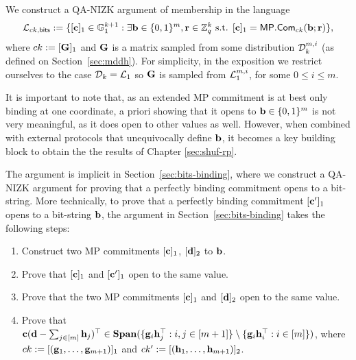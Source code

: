We construct a QA-NIZK argument of membership in the language
$$
\mathcal{L}_{ck,\mathsf{bits}} := \{[\mathbf{c}]_1\in\mathbb{G}_1^{k+1} : \exists \mathbf{b}\in\{0,1\}^m,\mathbf{r}\in\mathbb{Z}_q^k \text{ s.t. } [\mathbf{c}]_1 = \mathsf{MP}.\mathsf{Com}_{ck}(\mathbf{b};\mathbf{r})\},
$$
where $ck:=[\mathbf{{G}}]_1$ and $\mathbf{{G}}$ is a matrix sampled from 
some distribution $\mathcal{D}_k^{m,i}$ (as defined on Section~\ref{sec:mddh}). For simplicity, in the exposition we restrict ourselves to the case $\mathcal{D}_k=\mathcal{L}_{1}$ so  $\mathbf{{G}}$ is sampled from $\mathcal{L}_1^{m,i}$, for some $0 \leq i \leq m$.

It is important to note that, as an extended MP commitment is at best only binding at one coordinate, a priori showing that it opens to $\mathbf{b} \in \{0,1\}^m$ is not very meaningful, as it does open to other values as well. However, when combined with external protocols that unequivocally define $\mathbf{b}$, it becomes a key building block to obtain the the results of Chapter \ref{sec:shuf-rp}.

The argument is implicit in Section~\ref{sec:bits-binding}, where we construct a QA-NIZK argument for proving that a perfectly binding commitment opens to a bit-string. More technically, to prove that a  perfectly binding commitment $[\mathbf{c}']_1$ opens to a bit-string $\mathbf{b}$, the argument in Section~\ref{sec:bits-binding} takes the following steps:
\begin{enumerate}
\item Construct two MP commitments $[\mathbf{c}]_1$, 
$[\mathbf{d}]_2$ to $\mathbf{b}$. 
\item Prove that $[\mathbf{c}]_1$ and $[\mathbf{c}']_1$ open to the same value. 
\item Prove that the two MP commitments $[\mathbf{c}]_1$ and $[\mathbf{d}]_2$ open to the same value.
\item Prove that $\mathbf{c}(\mathbf{d}-\sum_{j \in [m]}
\mathbf{h}_j)^\top\in\mathbf{Span}(\{\mathbf{g}_i\mathbf{h}_j^\top:i,j\in[m+1]\}\setminus\{\mathbf{g}_i\mathbf{h}_i^\top:i\in[m]\})$, where $ck:=[(\mathbf{g}_1,\ldots,\mathbf{g}_{m+1})]_1$ and $ck':=[(\mathbf{h}_1,\ldots,\mathbf{h}_{m+1})]_2$.
\end{enumerate}


